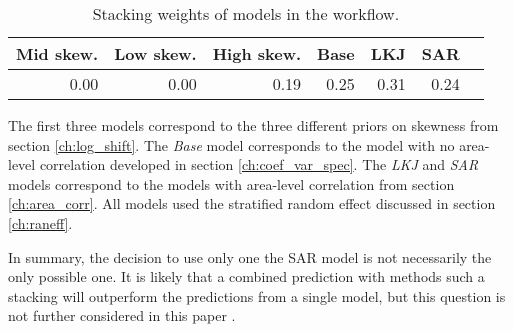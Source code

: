\begin{table}[ht]
    \caption{Stacking weights of models in the workflow.}
    \begin{center}
        \begin{tabular}{rrrrrrr}
          \hline
         Mid skew. & Low skew. & High skew. & Base & LKJ & SAR \\
          \hline
         0.00 & 0.00 & 0.19 & 0.25 & 0.31 & 0.24 \\
           \hline
        \end{tabular}
    \end{center}

    \begin{adjustwidth}{45pt}{45pt}
        \footnotesize{The first three models correspond to the three different priors on skewness from section \ref{ch:log_shift}. The \textit{Base} model corresponds to the model with no area-level correlation developed in section \ref{ch:coef_var_spec}. The \textit{LKJ} and \textit{SAR} models correspond to the models with area-level correlation from section \ref{ch:area_corr}. All models used the stratified random effect discussed in section \ref{ch:raneff}.}
    \end{adjustwidth}
    \label{tab:stacking}
\end{table}

In summary, the decision to use only one the SAR model is not necessarily the only possible one.
It is likely that a combined prediction with methods such a stacking will outperform the predictions from a single model, but this question is not further considered in this paper .
